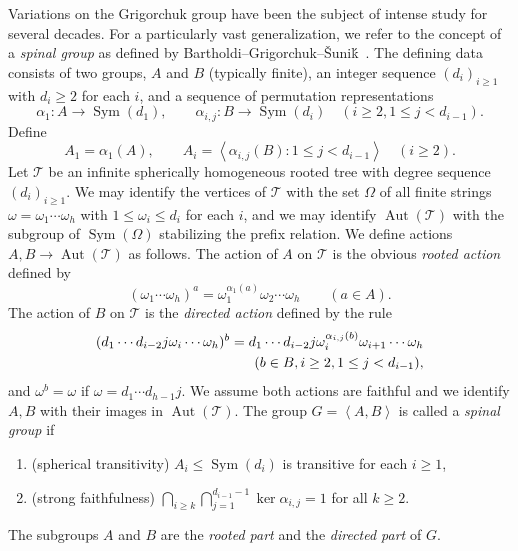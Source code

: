 \documentclass[11pt,reqno]{amsart}
\numberwithin{equation}{section}
\theoremstyle{definition}
\theoremstyle{remark}
\def\T{\mathcal{T}} %
\newcommand\opr[1]{\operatorname{#1}}
\def\Sym{\opr{Sym}}
\def\Aut{\opr{Aut}}
\newcommand\gen[1]{\left\langle#1\right\rangle}
\numberwithin{equation}{section}
\begin{document}
Variations on the Grigorchuk group have been the subject of intense study for several decades.
For a particularly vast generalization, we refer to the concept of a \emph{spinal group} as defined by Bartholdi--Grigorchuk--\v{S}uni\'{k}~\cite{BGS-branch-groups-book}.
The defining data consists of two groups, $A$ and $B$ (typically finite), an integer sequence $(d_i)_{i \ge 1}$ with $d_i \ge 2$ for each $i$, and a sequence of permutation representations
\[
    \alpha_1 : A \to \Sym(d_1),
    \qquad
    \alpha_{i,j} : B \to \Sym(d_i) \quad (i \ge 2, 1 \le j < d_{i-1}).
\]
Define
\[
    A_1 = \alpha_1(A),
    \qquad
    A_i = \gen{\alpha_{i,j}(B) : 1 \le j < d_{i-1}} \quad (i \ge 2).
\]
Let $\T$ be an infinite spherically homogeneous rooted tree with degree sequence $(d_i)_{i \ge 1}$.
We may identify the vertices of $\T$ with the set $\Omega$ of all finite strings $\omega = \omega_1 \cdots \omega_h$ with $1 \le \omega_i \le d_i$ for each $i$,
and we may identify $\Aut(\T)$ with the subgroup of $\Sym(\Omega)$ stabilizing the prefix relation.
We define actions $A, B \to \Aut(\T)$ as follows.
The action of $A$ on $\T$ is the obvious \emph{rooted action} defined by
\[
    (\omega_1 \cdots \omega_h)^a = \omega_1^{\alpha_1(a)}\omega_2 \cdots \omega_h \qquad (a \in A).
\]
The action of $B$ on $\T$ is the \emph{directed action} defined by the rule
\begin{align*}
    (d_1 \cdots d_{i-2} j \omega_i \cdots \omega_h)^b =
        d_1 \cdots d_{i-2} j \omega_i^{\alpha_{i,j}(b)} \omega_{i+1} \cdots \omega_h \\
        \hfill(b \in B, i \ge 2, 1 \le j < d_{i-1}),
\end{align*}
and $\omega^b = \omega$ if $\omega = d_1 \cdots d_{h-1} j$.
We assume both actions are faithful and we identify $A, B$ with their images in $\Aut(\T)$.
The group $G = \gen{A,B}$ is called a \emph{spinal group} if
\begin{enumerate}
    \item (spherical transitivity) $A_i \le \Sym(d_i)$ is transitive for each $i \ge 1$,
    \item (strong faithfulness) $\bigcap_{i \ge k} \bigcap_{j=1}^{d_{i-1} - 1} \ker \alpha_{i,j} = 1$ for all $k \ge 2$.
\end{enumerate}
The subgroups $A$ and $B$ are the \emph{rooted part} and the \emph{directed part} of $G$.
\end{document}
